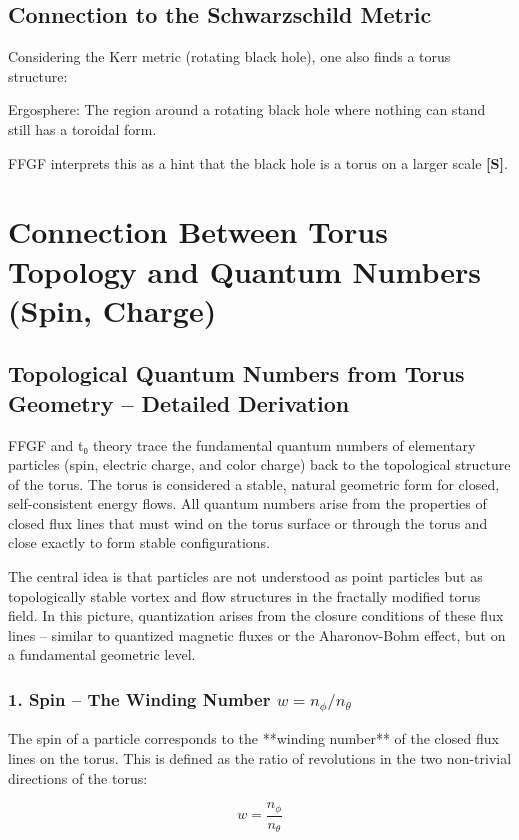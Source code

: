\subsection{Connection to the Schwarzschild Metric}
Considering the Kerr metric (rotating black hole), one also finds a torus structure:

Ergosphere: The region around a rotating black hole where nothing can stand still has a toroidal form.

FFGF interprets this as a hint that the black hole is a torus on a larger scale \textbf{[S]}.

\section{Connection Between Torus Topology and Quantum Numbers (Spin, Charge)}

\subsection{Topological Quantum Numbers from Torus Geometry – Detailed Derivation}

FFGF and t₀ theory trace the fundamental quantum numbers of elementary particles (spin, electric charge, and color charge) back to the topological structure of the torus. The torus is considered a stable, natural geometric form for closed, self-consistent energy flows. All quantum numbers arise from the properties of closed flux lines that must wind on the torus surface or through the torus and close exactly to form stable configurations.

The central idea is that particles are not understood as point particles but as topologically stable vortex and flow structures in the fractally modified torus field. In this picture, quantization arises from the closure conditions of these flux lines – similar to quantized magnetic fluxes or the Aharonov-Bohm effect, but on a fundamental geometric level.

\subsubsection{1. Spin – The Winding Number $w = n_\phi / n_\theta$}

The spin of a particle corresponds to the **winding number** of the closed flux lines on the torus. This is defined as the ratio of revolutions in the two non-trivial directions of the torus:

\begin{equation}
	w = \frac{n_\phi}{n_\theta}
	\label{eq:winding_number}
\end{equation}

